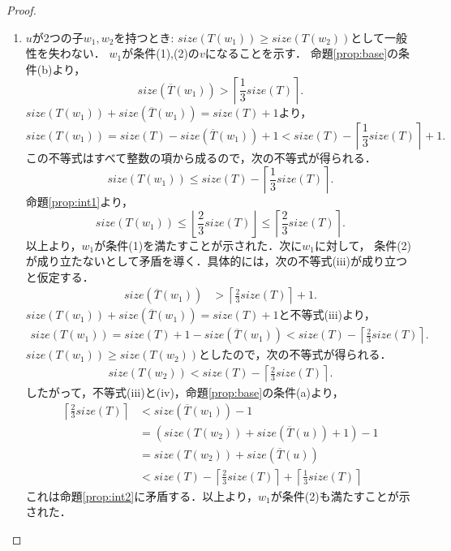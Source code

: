 \begin{proof}
\begin{enumerate}
\item $u$が2つの子$w_{1},w_{2}$を持つとき: $size(T(w_{1}))\geq size(T(w_{2}))$として一般性を失わない．
$w_{1}$が条件(1),(2)の$v$になることを示す．
命題\ref{prop:base}の条件(b)より，
$$size(\overline{T}(w_{1}))>\left\lceil\frac{1}{3}size(T)\right\rceil.$$
$size(T(w_{1})) + size(\overline{T}(w_{1})) = size(T) + 1$より，
$$size(T(w_{1})) = size(T) - size(\overline{T}(w_{1})) + 1
< size(T) - \left\lceil\frac{1}{3}size(T)\right\rceil + 1.$$
この不等式はすべて整数の項から成るので，次の不等式が得られる．
$$size(T(w_{1})) \leq size(T) - \left\lceil\frac{1}{3}size(T)\right\rceil.$$
命題\ref{prop:int1}より，
$$size(T(w_{1})) \leq \left\lfloor\frac{2}{3}size(T)\right\rfloor
\leq\left\lceil\frac{2}{3}size(T)\right\rceil.$$
以上より，$w_{1}$が条件(1)を満たすことが示された．次に$w_{1}$に対して，
条件(2)が成り立たないとして矛盾を導く．具体的には，次の不等式(iii)が成り立つと仮定する．
\begin{align*}
size(\overline{T}(w_{1}))&>\left\lceil\frac{2}{3}size(T)\right\rceil + 1.\tag{iii}
\end{align*}
$size(T(w_{1})) + size(\overline{T}(w_{1})) = size(T) + 1$と不等式(iii)より，
\begin{align*}
size(T(w_{1})) = size(T) + 1 - size(\overline{T}(w_{1})) < size(T) - \left\lceil\frac{2}{3}size(T)\right\rceil.
\end{align*}
$size(T(w_{1}))\geq size(T(w_{2}))$としたので，次の不等式が得られる．
\begin{align*}
size(T(w_{2})) < size(T) - \left\lceil\frac{2}{3}size(T)\right\rceil.\tag{iv}
\end{align*}
したがって，不等式(iii)と(iv)，命題\ref{prop:base}の条件(a)より，
\begin{align*}
  \left\lceil\frac{2}{3}size(T)\right\rceil & < size(\overline{T}(w_{1})) - 1\\
  & = (size(T(w_{2})) + size(\overline{T}(u)) + 1) - 1\\
  & = size(T(w_{2})) + size(\overline{T}(u))\\
  & < size(T) - \left\lceil\frac{2}{3}size(T)\right\rceil + \left\lceil\frac{1}{3}size(T)\right\rceil
  \end{align*}
これは命題\ref{prop:int2}に矛盾する．以上より，$w_{1}$が条件(2)も満たすことが示された．
\end{enumerate}
\end{proof}

